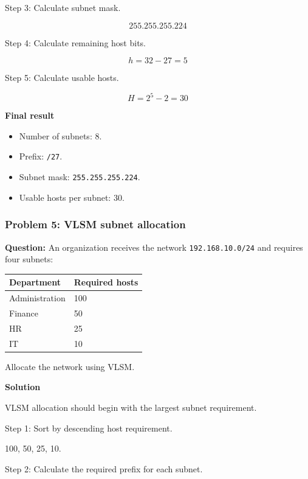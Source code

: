 Step 3: Calculate subnet mask.



\[
\boxed{255.255.255.224}
\]



Step 4: Calculate remaining host bits.



\[
h=32-27=5
\]



Step 5: Calculate usable hosts.



\[
H=2^5-2=30
\]



\textbf{Final result}

\begin{itemize}
\item Number of subnets: 8.
\item Prefix: \texttt{/27}.
\item Subnet mask: \texttt{255.255.255.224}.
\item Usable hosts per subnet: 30.
\end{itemize}

\subsubsection*{Problem 5: VLSM subnet allocation}

\textbf{Question:} An organization receives the network \texttt{192.168.10.0/24} and requires four subnets:

\begin{center}
\begin{tabularx}{\linewidth}{p{5.5cm} X}
\toprule
\textbf{Department} & \textbf{Required hosts} \\
\midrule
Administration & 100 \\
Finance & 50 \\
HR & 25 \\
IT & 10 \\
\bottomrule
\end{tabularx}
\end{center}

Allocate the network using VLSM.

\textbf{Solution}

VLSM allocation should begin with the largest subnet requirement.

Step 1: Sort by descending host requirement.

100, 50, 25, 10.

Step 2: Calculate the required prefix for each subnet.

